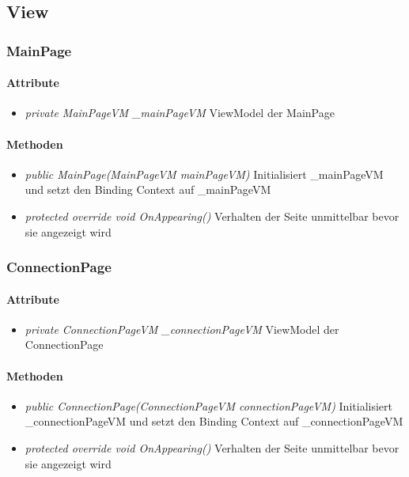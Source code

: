\documentclass[../entwurf.tex]{subfiles}
\begin{document}
\newcommand{\attr}[1]{\item \textit{#1}}

\subsection{View}
\subsubsection{MainPage}

\paragraph{Attribute}

\begin{itemize}
	\attr{private MainPageVM \_mainPageVM} ViewModel der MainPage
\end{itemize}

\paragraph{Methoden}
\begin{itemize}
	\attr{public MainPage(MainPageVM mainPageVM)} Initialisiert \_mainPageVM und setzt den Binding Context 			auf \_mainPageVM  
	\attr{protected override void OnAppearing()} Verhalten der Seite unmittelbar bevor sie angezeigt wird
\end{itemize}

\subsubsection{ConnectionPage}

\paragraph{Attribute}
\begin{itemize}
	\attr{private ConnectionPageVM \_connectionPageVM} ViewModel der ConnectionPage
\end{itemize}

\paragraph{Methoden}
\begin{itemize}
	\attr{public ConnectionPage(ConnectionPageVM connectionPageVM)} Initialisiert \_connectionPageVM und setzt den Binding Context 			auf \_connectionPageVM
	\attr{protected override void OnAppearing()} Verhalten der Seite unmittelbar bevor sie angezeigt wird
\end{itemize}
\end{document}
